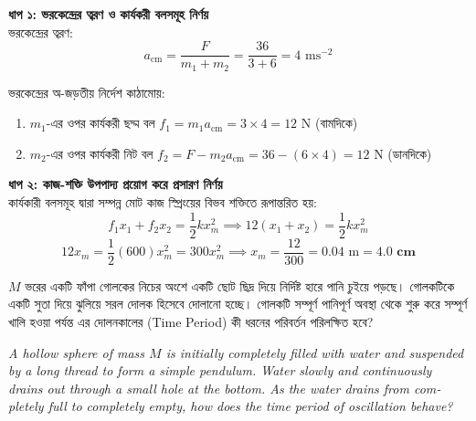 \documentclass[12pt, a4paper]{article}
\begin{document}
\begin{tcolorbox}[solutionbox={সমাধান (Solution)}]
\noindent
\textbf{ধাপ ১: ভরকেন্দ্রের ত্বরণ ও কার্যকরী বলসমূহ নির্ণয়} \\
ভরকেন্দ্রের ত্বরণ:
\[a_{\text{cm}} = \frac{F}{m_1 + m_2} = \frac{36}{3 + 6} = 4\text{ ms}^{-2}\]

ভরকেন্দ্রের অ-জড়তীয় নির্দেশ কাঠামোয়:
\begin{enumerate}
    \item $m_1$-এর ওপর কার্যকরী ছদ্ম বল $f_1 = m_1 a_{\text{cm}} = 3 \times 4 = 12\text{ N}$ (বামদিকে)
    \item $m_2$-এর ওপর কার্যকরী নিট বল $f_2 = F - m_2 a_{\text{cm}} = 36 - (6 \times 4) = 12\text{ N}$ (ডানদিকে)
\end{enumerate}

\vspace{0.5em}
\noindent\textbf{ধাপ ২: কাজ-শক্তি উপপাদ্য প্রয়োগ করে প্রসারণ নির্ণয়} \\
কার্যকারী বলসমূহ দ্বারা সম্পন্ন মোট কাজ স্প্রিংয়ের বিভব শক্তিতে রূপান্তরিত হয়:
\[f_1 x_1 + f_2 x_2 = \frac{1}{2} k x_m^2 \implies 12(x_1 + x_2) = \frac{1}{2} k x_m^2\]
\[12 x_m = \frac{1}{2} (600) x_m^2 = 300 x_m^2 \implies x_m = \frac{12}{300} = 0.04\text{ m} = \mathbf{4.0\text{ cm}}\]
\end{tcolorbox}
\begin{tcolorbox}[questionbox={প্রশ্ন (Question) 4}]
\noindent
$M$ ভরের একটি ফাঁপা গোলকের নিচের অংশে একটি ছোট ছিদ্র দিয়ে নির্দিষ্ট হারে পানি চুইয়ে পড়ছে। গোলকটিকে একটি সুতা দিয়ে ঝুলিয়ে সরল দোলক হিসেবে দোলানো হচ্ছে। গোলকটি সম্পূর্ণ পানিপূর্ণ অবস্থা থেকে শুরু করে সম্পূর্ণ খালি হওয়া পর্যন্ত এর দোলনকালের (Time Period) কী ধরনের পরিবর্তন পরিলক্ষিত হবে?

\vspace{0.8em}
\begin{english}
\noindent\textit{\color{darkgray}
A hollow sphere of mass $M$ is initially completely filled with water and suspended by a long thread to form a simple pendulum. Water slowly and continuously drains out through a small hole at the bottom. As the water drains from completely full to completely empty, how does the time period of oscillation behave?
}
\end{english}
\end{tcolorbox}
\end{document}

